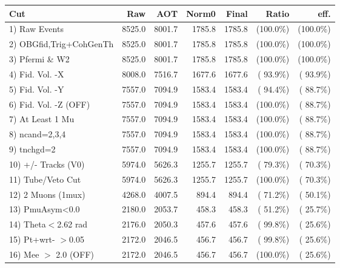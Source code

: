  \begin{table}[h!]\centering
 \begin{tabular}{||l||r|r|r|r|r|r||}
 \hline
 \hline
 Cut & Raw & AOT & Norm0 & Final & Ratio & eff.       \\
 \hline
  1) Raw Events           &       8525.0 &       8001.7 &       1785.8 &       1785.8 & (100.0\%) & (100.0\%) \\
  2) OBGfid,Trig+CohGenTh &       8525.0 &       8001.7 &       1785.8 &       1785.8 & (100.0\%) & (100.0\%) \\
  3) Pfermi \& W2         &       8525.0 &       8001.7 &       1785.8 &       1785.8 & (100.0\%) & (100.0\%) \\
  4) Fid. Vol. -X         &       8008.0 &       7516.7 &       1677.6 &       1677.6 & ( 93.9\%) & ( 93.9\%) \\
  5) Fid. Vol. -Y         &       7557.0 &       7094.9 &       1583.4 &       1583.4 & ( 94.4\%) & ( 88.7\%) \\
  6) Fid. Vol. -Z (OFF)   &       7557.0 &       7094.9 &       1583.4 &       1583.4 & (100.0\%) & ( 88.7\%) \\
  7) At Least 1 Mu        &       7557.0 &       7094.9 &       1583.4 &       1583.4 & (100.0\%) & ( 88.7\%) \\
  8) ncand=2,3,4          &       7557.0 &       7094.9 &       1583.4 &       1583.4 & (100.0\%) & ( 88.7\%) \\
  9) tnchgd=2             &       7557.0 &       7094.9 &       1583.4 &       1583.4 & (100.0\%) & ( 88.7\%) \\
 10) +/- Tracks (V0)      &       5974.0 &       5626.3 &       1255.7 &       1255.7 & ( 79.3\%) & ( 70.3\%) \\
 11) Tube/Veto Cut        &       5974.0 &       5626.3 &       1255.7 &       1255.7 & (100.0\%) & ( 70.3\%) \\
 12) 2 Muons (1mux)       &       4268.0 &       4007.5 &        894.4 &        894.4 & ( 71.2\%) & ( 50.1\%) \\
 13) PmuAsym<0.0          &       2180.0 &       2053.7 &        458.3 &        458.3 & ( 51.2\%) & ( 25.7\%) \\
 14) Theta$<$2.62 rad     &       2176.0 &       2050.3 &        457.6 &        457.6 & ( 99.8\%) & ( 25.6\%) \\
 15) Pt+wrt- $>$0.05      &       2172.0 &       2046.5 &        456.7 &        456.7 & ( 99.8\%) & ( 25.6\%) \\
 16) Mee $>$ 2.0  (OFF)   &       2172.0 &       2046.5 &        456.7 &        456.7 & (100.0\%) & ( 25.6\%) \\

\end{tabular}
\end{table}

